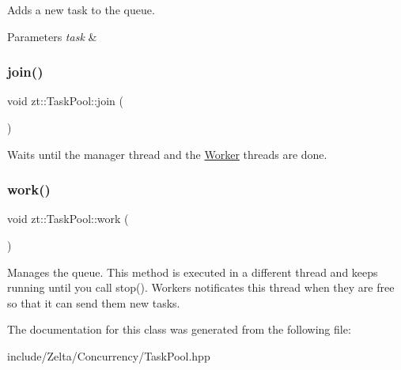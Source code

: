 Adds a new task to the queue. 
\begin{DoxyParams}{Parameters}
{\em task} & \\
\hline
\end{DoxyParams}
\mbox{\label{classzt_1_1_task_pool_a39276f6d847af21e7c6eff52a4712fea}} 
\subsubsection{\texorpdfstring{join()}{join()}}
{\footnotesize\ttfamily void zt\+::\+Task\+Pool\+::join (\begin{DoxyParamCaption}{ }\end{DoxyParamCaption})}

Waits until the manager thread and the \hyperlink{classzt_1_1_worker}{Worker} threads are done. \mbox{\label{classzt_1_1_task_pool_a1b03b3bf318d4873e9109cd6c9ba43b4}} 
\subsubsection{\texorpdfstring{work()}{work()}}
{\footnotesize\ttfamily void zt\+::\+Task\+Pool\+::work (\begin{DoxyParamCaption}{ }\end{DoxyParamCaption})\hspace{0.3cm}{\ttfamily [protected]}}

Manages the queue. This method is executed in a different thread and keeps running until you call stop(). Workers notificates this thread when they are free so that it can send them new tasks. 

The documentation for this class was generated from the following file\+:\begin{DoxyCompactItemize}
\item 
include/\+Zelta/\+Concurrency/Task\+Pool.\+hpp\end{DoxyCompactItemize}
